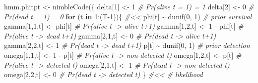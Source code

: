 \documentclass[
  12pt,
]{krantz}
\newenvironment{Shaded}{\begin{snugshade}}{\end{snugshade}}
\newcommand{\CommentTok}[1]{\textcolor[rgb]{0.56,0.35,0.01}{\textit{#1}}}
\newcommand{\ControlFlowTok}[1]{\textcolor[rgb]{0.13,0.29,0.53}{\textbf{#1}}}
\newcommand{\DecValTok}[1]{\textcolor[rgb]{0.00,0.00,0.81}{#1}}
\newcommand{\FunctionTok}[1]{\textcolor[rgb]{0.00,0.00,0.00}{#1}}
\newcommand{\NormalTok}[1]{#1}
\newcommand{\OtherTok}[1]{\textcolor[rgb]{0.56,0.35,0.01}{#1}}
\newcommand{\SpecialCharTok}[1]{\textcolor[rgb]{0.00,0.00,0.00}{#1}}
\begin{document}
\begin{Shaded}
\begin{Highlighting}[]
\NormalTok{hmm.phitpt }\OtherTok{\textless{}{-}} \FunctionTok{nimbleCode}\NormalTok{(\{}
\NormalTok{  delta[}\DecValTok{1}\NormalTok{] }\OtherTok{\textless{}{-}} \DecValTok{1}          \CommentTok{\# Pr(alive t = 1) = 1}
\NormalTok{  delta[}\DecValTok{2}\NormalTok{] }\OtherTok{\textless{}{-}} \DecValTok{0}          \CommentTok{\# Pr(dead t = 1) = 0}
  \ControlFlowTok{for}\NormalTok{ (t }\ControlFlowTok{in} \DecValTok{1}\SpecialCharTok{:}\NormalTok{(T}\DecValTok{{-}1}\NormalTok{))\{ }\CommentTok{\#\textless{}\textless{}}
\NormalTok{    phi[t] }\SpecialCharTok{\textasciitilde{}} \FunctionTok{dunif}\NormalTok{(}\DecValTok{0}\NormalTok{, }\DecValTok{1}\NormalTok{) }\CommentTok{\# prior survival}
\NormalTok{    gamma[}\DecValTok{1}\NormalTok{,}\DecValTok{1}\NormalTok{,t] }\OtherTok{\textless{}{-}}\NormalTok{ phi[t]      }\CommentTok{\# Pr(alive t {-}\textgreater{} alive t+1)}
\NormalTok{    gamma[}\DecValTok{1}\NormalTok{,}\DecValTok{2}\NormalTok{,t] }\OtherTok{\textless{}{-}} \DecValTok{1} \SpecialCharTok{{-}}\NormalTok{ phi[t]  }\CommentTok{\# Pr(alive t {-}\textgreater{} dead t+1)}
\NormalTok{    gamma[}\DecValTok{2}\NormalTok{,}\DecValTok{1}\NormalTok{,t] }\OtherTok{\textless{}{-}} \DecValTok{0}        \CommentTok{\# Pr(dead t {-}\textgreater{} alive t+1)}
\NormalTok{    gamma[}\DecValTok{2}\NormalTok{,}\DecValTok{2}\NormalTok{,t] }\OtherTok{\textless{}{-}} \DecValTok{1}        \CommentTok{\# Pr(dead t {-}\textgreater{} dead t+1)}
\NormalTok{    p[t] }\SpecialCharTok{\textasciitilde{}} \FunctionTok{dunif}\NormalTok{(}\DecValTok{0}\NormalTok{, }\DecValTok{1}\NormalTok{) }\CommentTok{\# prior detection}
\NormalTok{    omega[}\DecValTok{1}\NormalTok{,}\DecValTok{1}\NormalTok{,t] }\OtherTok{\textless{}{-}} \DecValTok{1} \SpecialCharTok{{-}}\NormalTok{ p[t]    }\CommentTok{\# Pr(alive t {-}\textgreater{} non{-}detected t)}
\NormalTok{    omega[}\DecValTok{1}\NormalTok{,}\DecValTok{2}\NormalTok{,t] }\OtherTok{\textless{}{-}}\NormalTok{ p[t]        }\CommentTok{\# Pr(alive t {-}\textgreater{} detected t)}
\NormalTok{    omega[}\DecValTok{2}\NormalTok{,}\DecValTok{1}\NormalTok{,t] }\OtherTok{\textless{}{-}} \DecValTok{1}        \CommentTok{\# Pr(dead t {-}\textgreater{} non{-}detected t)}
\NormalTok{    omega[}\DecValTok{2}\NormalTok{,}\DecValTok{2}\NormalTok{,t] }\OtherTok{\textless{}{-}} \DecValTok{0}        \CommentTok{\# Pr(dead t {-}\textgreater{} detected t)}
\NormalTok{  \} }\CommentTok{\#\textless{}\textless{}}
  \CommentTok{\# likelihood}

\end{Highlighting}
\end{Shaded}
\end{document}
